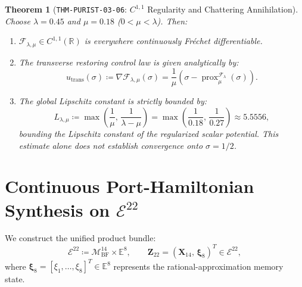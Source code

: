\documentclass[11pt,a4paper,reqno]{article}
\theoremstyle{plain}
\newtheorem{theorem}{Theorem}[section]
\theoremstyle{definition}
\theoremstyle{remark}
\numberwithin{equation}{section}
\begin{document}
\begin{theorem}[\texttt{THM-PURIST-03-06}: $C^{1,1}$ Regularity and Chattering Annihilation]
\label{thm:lasry_lions_regularity}
Choose $\lambda = 0.45$ and $\mu = 0.18$ ($0 < \mu < \lambda$). Then:
\begin{enumerate}[label=(\roman*),leftmargin=1.8em]
  \item $\mathcal{F}_{\lambda,\mu} \in C^{1,1}(\mathbb{R})$ is everywhere continuously Fr\'{e}chet differentiable.
  \item The transverse restoring control law is given analytically by:
  \begin{equation}
    u_{\mathrm{trans}}(\sigma) \coloneqq \nabla \mathcal{F}_{\lambda,\mu}(\sigma) = \frac{1}{\mu} \left( \sigma - \operatorname{prox}_\mu^{\mathcal{F}_\lambda}(\sigma) \right).
    \label{eq:lasry_control_law}
  \end{equation}
  \item The global Lipschitz constant is strictly bounded by:
  \begin{equation}
    L_{\lambda,\mu} \coloneqq \max\left( \frac{1}{\mu}, \, \frac{1}{\lambda - \mu} \right) = \max\left( \frac{1}{0.18}, \, \frac{1}{0.27} \right) \approx 5.5556,
  \end{equation}
  bounding the Lipschitz constant of the regularized scalar potential. This estimate alone does not establish convergence onto $\sigma=1/2$.
\end{enumerate}
\end{theorem}

\section{Continuous Port-Hamiltonian Synthesis on \texorpdfstring{$\mathcal{E}^{22}$}{E22}}
\label{sec:port_hamiltonian}

We construct the unified product bundle:
\begin{equation}
  \mathcal{E}^{22} \coloneqq \mathcal{M}_{\mathrm{BF}}^{14} \times \mathbb{E}^8, \qquad \bm{Z}_{22} = (\bm{X}_{14}, \, \bm{\xi}_8)^T \in \mathcal{E}^{22},
\end{equation}
where $\bm{\xi}_8 = [\xi_1, \dots, \xi_8]^T \in \mathbb{E}^8$ represents the rational-approximation memory state.
\end{document}
